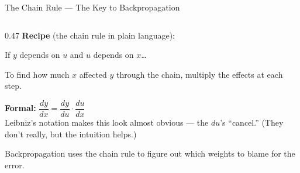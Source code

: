 \begin{frame}{The Chain Rule --- The Key to Backpropagation}

  \begin{columns}[T]
    \begin{column}{0.47\textwidth}
      \textbf{Recipe} (the chain rule in plain language):

      \vspace{0.3em}
      If $y$ depends on $u$ and $u$ depends on $x$\ldots

      \vspace{0.2em}
      To find how much $x$ affected $y$ through the chain,
      \alert{multiply the effects at each step}.

      \vspace{0.5em}
      {\footnotesize\colorbox{enlightenmentTeal!8}{\parbox{0.92\linewidth}{%
        \textbf{Formal:}\quad
        $\dfrac{dy}{dx} = \dfrac{dy}{du} \cdot \dfrac{du}{dx}$\\[4pt]
        Leibniz's notation makes this look almost obvious ---
        the $du$'s ``cancel.'' (They don't really, but the intuition helps.)}}}

      \vspace{0.5em}
      \begin{insightbox}
        Backpropagation uses the chain rule to figure out which weights
        to blame for the error.
      \end{insightbox}
    \end{column}


\end{columns}
\end{frame}
